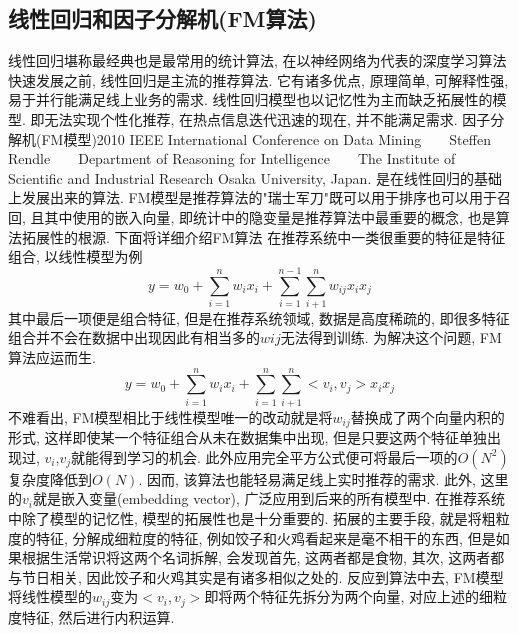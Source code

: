 \subsection{线性回归和因子分解机(FM算法)}
线性回归堪称最经典也是最常用的统计算法, 在以神经网络为代表的深度学习算法快速发展之前, 线性回归是主流的推荐算法. 它有诸多优点, 原理简单, 可解释性强, 易于并行能满足线上业务的需求. 线性回归模型也以记忆性为主而缺乏拓展性的模型. 即无法实现个性化推荐, 在热点信息迭代迅速的现在, 并不能满足需求.
因子分解机(FM模型)2010 IEEE International Conference on Data Mining　　Steffen Rendle　　Department of Reasoning for Intelligence　　The Institute of Scientific and Industrial Research Osaka University, Japan. 是在线性回归的基础上发展出来的算法. FM模型是推荐算法的"瑞士军刀"既可以用于排序也可以用于召回, 且其中使用的嵌入向量, 即统计中的隐变量是推荐算法中最重要的概念, 也是算法拓展性的根源. 下面将详细介绍FM算法
在推荐系统中一类很重要的特征是特征组合, 以线性模型为例
\begin{equation}
	y=w_{0}+\sum_{i=1}^{n} w_{i} x_{i}+\sum_{i=1}^{n-1} \sum_{i+1}^{n} w_{i j} x_{i} x_{j}
\end{equation}
其中最后一项便是组合特征, 但是在推荐系统领域, 数据是高度稀疏的, 即很多特征组合并不会在数据中出现因此有相当多的$w{ij}$无法得到训练. 为解决这个问题, FM算法应运而生.
\begin{equation}
	y=w_{0}+\sum_{i=1}^{n} w_{i} x_{i}+\sum_{i=1}^{n} \sum_{i+1}^{n}<v_{i}, v_{j}>x_{i} x_{j}
\end{equation}
不难看出, FM模型相比于线性模型唯一的改动就是将$w_{ij}$替换成了两个向量内积的形式, 这样即使某一个特征组合从未在数据集中出现, 但是只要这两个特征单独出现过, $v_i$,$v_j$就能得到学习的机会. 此外应用完全平方公式便可将最后一项的$O(N^2)$复杂度降低到$O(N)$. 因而, 该算法也能轻易满足线上实时推荐的需求. 此外, 这里的$v_{i}$就是嵌入变量(embedding vector), 广泛应用到后来的所有模型中.
在推荐系统中除了模型的记忆性, 模型的拓展性也是十分重要的.  拓展的主要手段, 就是将粗粒度的特征, 分解成细粒度的特征, 例如饺子和火鸡看起来是毫不相干的东西, 但是如果根据生活常识将这两个名词拆解, 会发现首先, 这两者都是食物, 其次, 这两者都与节日相关, 因此饺子和火鸡其实是有诸多相似之处的. 反应到算法中去, FM模型将线性模型的$w_{ij}$变为$<v_i,v_j>$即将两个特征先拆分为两个向量, 对应上述的细粒度特征, 然后进行内积运算.
